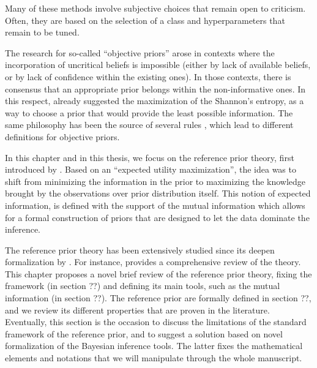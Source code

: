 Many of these  methods involve subjective choices that remain open to criticism. Often, they are based on the selection of a class and hyperparameters that remain to be tuned.


The research for so-called ``objective priors'' arose in contexts where the incorporation of uncritical beliefs is impossible (either by lack of available beliefs, or by lack of confidence within the existing ones).
In those contexts, there is consensus that an appropriate prior belongs within the non-informative ones. In this respect, \citet{lindley_measure_1956} already suggested the maximization of the Shannon's entropy, as a way to choose a prior that would provide the least possible information.
The same philosophy has been the source of several rules \citep{kass_selection_1996, datta_invariance_1996,berger_objective_2008}, which lead to different definitions for objective priors.

In this chapter and in this thesis, we focus on the reference prior theory, first introduced by \citet{bernardo_expected_1979}. 
Based on an ``expected utility maximization'',
the idea was to shift from minimizing the information in the prior to maximizing the knowledge brought by the observations over prior distribution itself.
This notion of expected information, is defined with the support of the mutual information which allows for a formal construction of priors that are designed to let the data dominate the inference.

The reference prior theory has been extensively studied since its deepen formalization by \citet{berger_formal_2009}. For instance, \citet{mure_objective_2018} provides a comprehensive review of the theory.
This chapter proposes a novel brief review of the reference prior theory, fixing the framework (in section ??) and defining its main tools, such as the mutual information (in section ??). The reference prior are formally defined in section ??, and we review its different properties that are proven in the literature.
Eventually, this section is the occasion to discuss the limitations of the standard framework of the reference prior, and to suggest a solution based on novel formalization of the Bayesian inference tools.  The latter fixes the mathematical elements and notations that we will manipulate through the whole manuscript.








